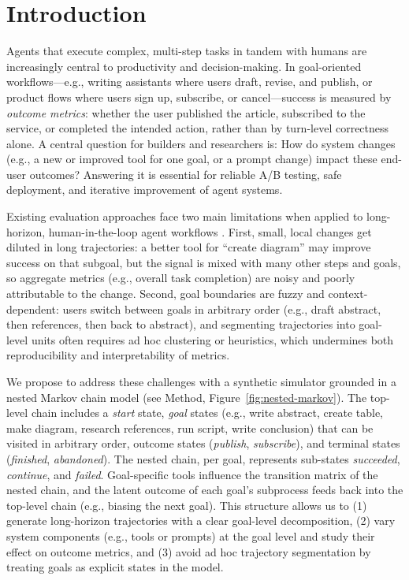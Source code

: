 \section{Introduction}
\label{sec:introduction}

Agents that execute complex, multi-step tasks in tandem with humans are increasingly central to productivity and decision-making. In goal-oriented workflows---e.g., writing assistants where users draft, revise, and publish, or product flows where users sign up, subscribe, or cancel---success is measured by \emph{outcome metrics}: whether the user published the article, subscribed to the service, or completed the intended action, rather than by turn-level correctness alone. A central question for builders and researchers is: How do system changes (e.g., a new or improved tool for one goal, or a prompt change) impact these end-user outcomes? Answering it is essential for reliable A/B testing, safe deployment, and iterative improvement of agent systems.

Existing evaluation approaches face two main limitations when applied to long-horizon, human-in-the-loop agent workflows \citep{kohavi2020trustworthy, takanobu2020goal, imbens2015causal}. First, small, local changes get diluted in long trajectories: a better tool for ``create diagram'' may improve success on that subgoal, but the signal is mixed with many other steps and goals, so aggregate metrics (e.g., overall task completion) are noisy and poorly attributable to the change. Second, goal boundaries are fuzzy and context-dependent: users switch between goals in arbitrary order (e.g., draft abstract, then references, then back to abstract), and segmenting trajectories into goal-level units often requires ad hoc clustering or heuristics, which undermines both reproducibility and interpretability of metrics.

We propose to address these challenges with a synthetic simulator grounded in a nested Markov chain model (see Method, Figure~\ref{fig:nested-markov}). The top-level chain includes a \emph{start} state, \emph{goal} states (e.g., write abstract, create table, make diagram, research references, run script, write conclusion) that can be visited in arbitrary order, outcome states (\emph{publish}, \emph{subscribe}), and terminal states (\emph{finished}, \emph{abandoned}). The nested chain, per goal, represents sub-states \emph{succeeded}, \emph{continue}, and \emph{failed}. Goal-specific tools influence the transition matrix of the nested chain, and the latent outcome of each goal's subprocess feeds back into the top-level chain (e.g., biasing the next goal). This structure allows us to (1) generate long-horizon trajectories with a clear goal-level decomposition, (2) vary system components (e.g., tools or prompts) at the goal level and study their effect on outcome metrics, and (3) avoid ad hoc trajectory segmentation by treating goals as explicit states in the model.

